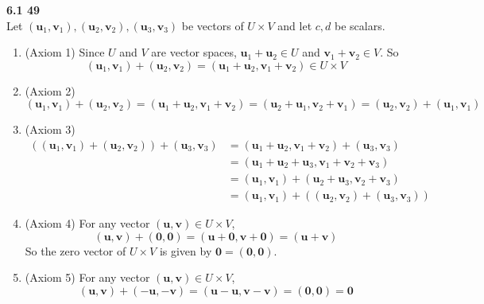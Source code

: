\textbf{6.1 49} \\
Let $(\textbf{u}_1, \textbf{v}_1), (\textbf{u}_2, \textbf{v}_2), (\textbf{u}_3, \textbf{v}_3)$ be vectors of $U \times V$ and let $c, d$ be scalars.
\begin{enumerate}
	\item (Axiom 1) Since $U$ and $V$ are vector spaces, $\textbf{u}_1 + \textbf{u}_2 \in U$ and $\textbf{v}_1 + \textbf{v}_2 \in V$. So \begin{equation*}
		(\textbf{u}_1, \textbf{v}_1) + (\textbf{u}_2 , \textbf{v}_2) = (\textbf{u}_1 + \textbf{u}_2, \textbf{v}_1 + \textbf{v}_2) \in U \times V
	\end{equation*} 
	\item (Axiom 2) \begin{equation*}
		(\textbf{u}_1, \textbf{v}_1) + (\textbf{u}_2, \textbf{v}_2) = (\textbf{u}_1 + \textbf{u}_2, \textbf{v}_1 + \textbf{v}_2) = (\textbf{u}_2 + \textbf{u}_1 , \textbf{v}_2 + \textbf{v}_1) = (\textbf{u}_2, \textbf{v}_2) + (\textbf{u}_1, \textbf{v}_1)
	\end{equation*}
	\item (Axiom 3) \begin{align*}
	((\textbf{u}_1, \textbf{v}_1) + (\textbf{u}_2, \textbf{v}_2)) + (\textbf{u}_3, \textbf{v}_3) &= (\textbf{u}_1 + \textbf{u}_2, \textbf{v}_1 + \textbf{v}_2) + (\textbf{u}_3, \textbf{v}_3) \\
	&= (\textbf{u}_1 + \textbf{u}_2 + \textbf{u}_3, \textbf{v}_1 + \textbf{v}_2 + \textbf{v}_3) \\
	&= (\textbf{u}_1, \textbf{v}_1) + (\textbf{u}_2 + \textbf{u}_3, \textbf{v}_2 + \textbf{v}_3) \\
	&= (\textbf{u}_1 ,\textbf{v}_1) + ((\textbf{u}_2, \textbf{v}_2) + (\textbf{u}_3, \textbf{v}_3))
	\end{align*}
	\item (Axiom 4) For any vector $(\textbf{u}, \textbf{v}) \in U \times V$, \begin{equation*}
		(\textbf{u}, \textbf{v}) + (\textbf{0}, \textbf{0}) = (\textbf{u} + \textbf{0}, \textbf{v} + \textbf{0}) = (\textbf{u} + \textbf{v})
	\end{equation*} So the zero vector of $U \times V$ is given by $\textbf{0} = (\textbf{0}, \textbf{0})$.
	\item (Axiom 5) For any vector $(\textbf{u}, \textbf{v}) \in U \times V$, \begin{equation*}
		(\textbf{u}, \textbf{v}) + (-\textbf{u}, -\textbf{v}) = (\textbf{u} - \textbf{u}, \textbf{v} - \textbf{v}) = (\textbf{0}, \textbf{0}) = \textbf{0}

\end{equation*}
\end{enumerate}
